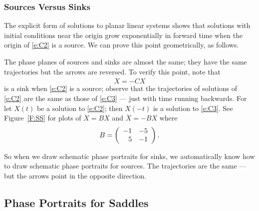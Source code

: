 \documentclass{ximera}
\begin{document}
\begin{figure*}[htb]
           \centerline{%
	   }
           \caption{Time series for different sinks.}
           \label{F:oscil}
\end{figure*}


\subsubsection*{Sources Versus Sinks}

The explicit form of solutions to planar linear systems shows that solutions
with initial conditions near the origin grow exponentially in forward time
when the origin of \eqref{e:C2} is a source.  We can prove this point
geometrically, as follows.

The phase planes of sources and sinks are almost the same; they have the
same trajectories but the arrows are reversed.  To verify this point, note
that
\begin{equation}  \label{e:C3}
\dot{X}=-CX
\end{equation}
is a sink when \eqref{e:C2} is a source; observe that the trajectories of
solutions of \eqref{e:C2} are the same as those of \eqref{e:C3} --- just with
time running backwards.  For let $X(t)$ be a solution to \eqref{e:C2}; then
$X(-t)$ is a solution to \eqref{e:C3}.   See Figure~\ref{F:SS} for plots of
$\dot{X}=BX$ and $\dot{X}=-BX$ where
\begin{equation}  \label{E:SS}
B = \left(\begin{array}{rr} -1 & -5\\ 5 &-1\end{array}\right).
\end{equation}

So when we draw schematic phase portraits
for sinks, we automatically know
how to draw schematic phase portraits for
sources.  The trajectories are
the same --- but the arrows point in the opposite direction.

\begin{figure*}[htb]
           \centerline{%
           }
           \caption{(Left) Sink $\dot{X}=BX$ where $B$ is given in
\protect{\eqref{E:SS}}.  (Right) Source $\dot{X}=-BX$.}
           \label{F:SS}
\end{figure*}


\subsection*{Phase Portraits for Saddles}
\end{document}
